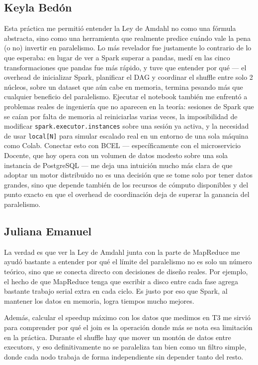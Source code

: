 \documentclass[11pt,a4paper]{article}
\begin{document}
\subsection*{Keyla Bedón}
Esta práctica me permitió entender la Ley de Amdahl no como una fórmula
abstracta, sino como una herramienta que realmente predice cuándo vale la
pena (o no) invertir en paralelismo. Lo más revelador fue justamente lo
contrario de lo que esperaba: en lugar de ver a Spark superar a pandas, medí
en las cinco transformaciones que pandas fue más rápido, y tuve que entender
por qué --- el overhead de inicializar Spark, planificar el DAG y coordinar
el shuffle entre solo 2 núcleos, sobre un dataset que aún cabe en memoria,
termina pesando más que cualquier beneficio del paralelismo. Ejecutar el
notebook también me enfrentó a problemas reales de ingeniería que no
aparecen en la teoría: sesiones de Spark que se caían por falta de memoria al
reiniciarlas varias veces, la imposibilidad de modificar
\texttt{spark.executor.instances} sobre una sesión ya activa, y la necesidad
de usar \texttt{local[N]} para simular escalado real en un entorno de una
sola máquina como Colab. Conectar esto con BCEL --- específicamente con el
microservicio Docente, que hoy opera con un volumen de datos modesto sobre
una sola instancia de PostgreSQL --- me deja una intuición mucho más clara
de que adoptar un motor distribuido no es una decisión que se tome solo por
tener datos grandes, sino que depende también de los recursos de cómputo
disponibles y del punto exacto en que el overhead de coordinación deja de
superar la ganancia del paralelismo.

\subsection*{Juliana Emanuel}
La verdad es que ver la Ley de Amdahl junta con la parte de MapReduce me
ayudó bastante a entender por qué el límite del paralelismo no es solo un
número teórico, sino que se conecta directo con decisiones de diseño
reales. Por ejemplo, el hecho de que MapReduce tenga que escribir a disco
entre cada fase agrega bastante trabajo serial extra en cada ciclo. Es
justo por eso que Spark, al mantener los datos en memoria, logra tiempos
mucho mejores.

Además, calcular el speedup máximo con los datos que medimos en T3 me
sirvió para comprender por qué el join es la operación donde más se nota
esa limitación en la práctica. Durante el shuffle hay que mover un montón
de datos entre executors, y eso definitivamente no se paraleliza tan bien
como un filtro simple, donde cada nodo trabaja de forma independiente sin
depender tanto del resto.
\end{document}
